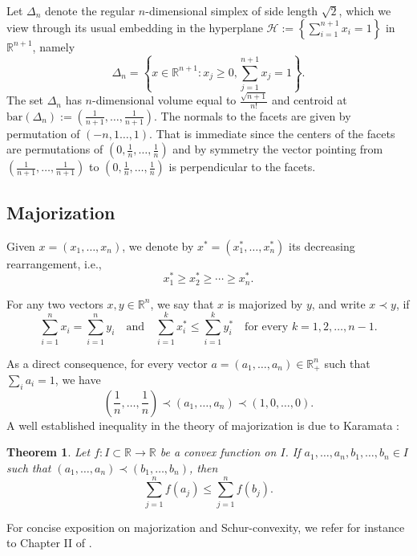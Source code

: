 \documentclass[10pt]{amsart}
\newcommand{\ls}{\leqslant}
\newcommand{\gr}{\geqslant}
\newcommand{\1}{\textbf{1}}
\numberwithin{equation}{section} %
\newtheorem{theorem}{Theorem}[section] %
\theoremstyle{remark}
\theoremstyle{definition}
\begin{document}
Let $\Delta_n$ denote the regular $n$-dimensional simplex of side length $\sqrt{2}$, which we view through its usual embedding in the hyperplane $\mathcal{H}:=\left \{ \sum_{i=1}^{n+1}x_i=1 \right\}$  in $\mathbb{R}^{n+1}$, namely
\[
\Delta_n = \left\{x\in\mathbb{R}^{n+1}: x_j\gr 0, \sum_{j=1}^{n+1}x_j=1\right\}.
\]
The set $\Delta_n$ has $n$-dimensional volume equal to $\frac{\sqrt{n+1}}{n!}$ and centroid at $\mathrm{bar}(\Delta_n):=\left(\frac{1}{n+1},\ldots,\frac{1}{n+1}\right)$. The normals to the facets  are given by permutation of $(-n,1\ldots,1)$. That is immediate since the centers of the facets are permutations of $\left(0,\frac{1}{n},\ldots,\frac{1}{n}\right)$ and by symmetry the vector pointing from$ \left(\frac{1}{n+1},\ldots,\frac{1}{n+1}\right)$ to $\left(0,\frac{1}{n},\ldots,\frac{1}{n}\right)$ is perpendicular to the facets.

\subsection{Majorization}
Given $x = (x_1, \ldots, x_n)$, we denote by $x^{*} = (x_1^{*}, \ldots, x_n^{*})$ its decreasing rearrangement, i.e.,
\[
x_1^{\ast} \ge x_2^{*} \ge \cdots \ge x_n^{\ast}.
\]

For any two vectors $x, y \in \mathbb{R}^n$, we say that $x$ is majorized by $y$, and write $x \prec y$, if
\[
\sum_{i=1}^n x_i = \sum_{i=1}^n y_i
\quad \text{and} \quad
\sum_{i=1}^k x_i^{*} \le \sum_{i=1}^k y_i^{*}
\quad \text{for every } k = 1, 2, \ldots, n-1.
\]

As a direct consequence, for every vector $a = (a_1, \ldots, a_n) \in \mathbb{R}^n_+$ such that $\sum_i a_i = 1$, we have
\begin{equation}\label{majorization seq}
\left( \frac{1}{n}, \ldots, \frac{1}{n} \right) \prec (a_1, \ldots, a_n) \prec (1, 0, \ldots, 0).
\end{equation}
A well established inequality in the theory of majorization is due to Karamata \cite{karamata1932inegalite}:
\begin{theorem}\label{Karamata}
Let $f:I\subset \mathbb{R}\rightarrow \mathbb{R}$ be a convex function on $I$. If $a_1,\ldots,a_n,b_1,\ldots,b_n\in I$   such that $(a_1,\ldots,a_n)\prec (b_1,\ldots,b_n)$, then 
\[
\sum_{j=1}^nf(a_j)\ls\sum_{j=1}^nf(b_j).
\]
\end{theorem}
For concise exposition on majorization and Schur-convexity, we refer for instance to Chapter II of \cite{bhatia2013matrix}.
\end{document}
